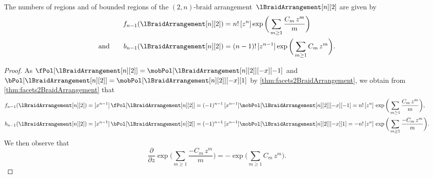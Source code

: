 \begin{corollary}
The numbers of regions and of bounded regions of the $(2,n)$-braid arrangement~$\lBraidArrangement[n][2]$ are given by
\begin{align*}
f_{n-1}(\lBraidArrangement[n][2]) 
& = n! \, [z^n] \exp \bigg( \sum_{m \ge 1} \frac{C_m \, z^m}{m} \bigg) \\
\text{and}\qquad
b_{n-1}(\lBraidArrangement[n][2]) 
& = (n-1)! \, [z^{n-1}] \exp \bigg( \sum_{m \ge 1} C_m \, z^m \bigg).
\end{align*}
\end{corollary}

\begin{proof}
As $\fPol[{\lBraidArrangement[n][2]}] = \mobPol[{\lBraidArrangement[n][2]}][-x][-1]$ and $\bPol[{\lBraidArrangement[n][2]}] = \mobPol[{\lBraidArrangement[n][2]}][-x][1]$ by \cref{thm:facets2BraidArrangement}, we obtain from \cref{thm:facets2BraidArrangement} that
\begin{align*}
f_{n-1}(\lBraidArrangement[n][2]) & = [x^{n-1}] \, \fPol[{\lBraidArrangement[n][2]}] = (-1)^{n-1} \, [x^{n-1}] \mobPol[{\lBraidArrangement[n][2]}][-x][-1] = n! \, [z^n]  \, \exp \bigg( \sum_{m \ge 1} \frac{C_m \, z^m}{m} \bigg), \\
b_{n-1}(\lBraidArrangement[n][2]) & = [x^{n-1}] \, \bPol[{\lBraidArrangement[n][2]}] = (-1)^{n-1} \, [x^{n-1}] \mobPol[{\lBraidArrangement[n][2]}][-x][1] = - n! \, [z^n]  \, \exp \bigg( \sum_{m \ge 1} \frac{- C_m \, z^m}{m} \bigg).
\end{align*}
We then observe that
\[
\frac{\partial}{\partial z} \exp \bigg( \sum_{m \ge 1} \frac{- C_m \, z^m}{m} \bigg) = - \exp \bigg( \sum_{m \ge 1} C_m \, z^m \bigg).
\]
\end{proof}

